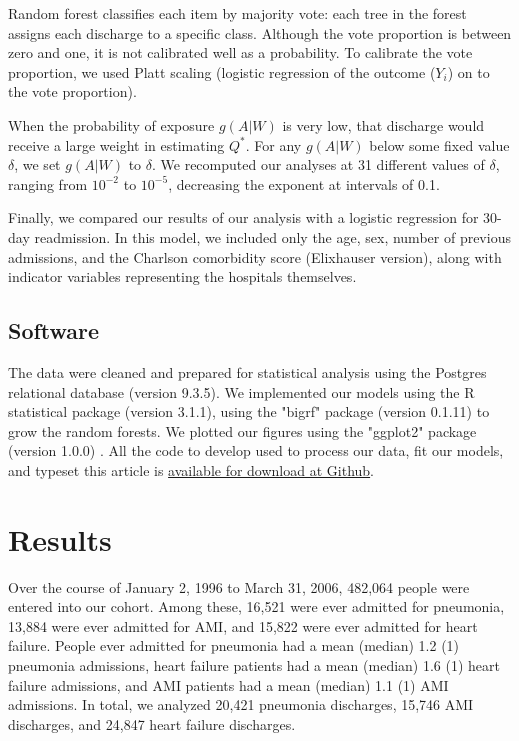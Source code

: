 \documentclass[]{article}\usepackage[]{graphicx}\usepackage[]{color}
\begin{document}
Random forest classifies each item by majority vote: each tree in the forest assigns each discharge to a specific class. Although the vote proportion is between zero and one, it is not calibrated well as a probability. To calibrate the vote proportion, we used Platt scaling\supercite{platt_probabilistic_1999} (logistic regression of the outcome ($Y_i$) on to the vote proportion).

When the probability of exposure $g(A|W)$ is very low, that discharge would receive a large weight in estimating $Q^*$. For any $g(A|W)$ below some fixed value $\delta$, we set $g(A|W)$ to $\delta$. We recomputed our analyses at 31 different values of $\delta$, ranging from $10^{-2}$ to $10^{-5}$, decreasing the exponent at intervals of 0.1.

Finally, we compared our results of our analysis with a logistic regression for 30-day readmission. In this model, we included only the age, sex, number of previous admissions, and the Charlson comorbidity score (Elixhauser version)\supercite{elixhauser_comorbidity_1998}, along with indicator variables representing the hospitals themselves.

\subsection{Software}
The data were cleaned and prepared for statistical analysis using the Postgres relational database (version 9.3.5). We implemented our models using the R statistical package (version 3.1.1),\supercite{team_r:_2014} using the "bigrf" package (version 0.1.11) to grow the random forests.\supercite{lim_bigrf:_2014} We plotted our figures using the "ggplot2" package (version 1.0.0) .\supercite{wickham_ggplot2:_2009} All the code to develop used to process our data, fit our models, and typeset this article is \href{https://github.com/nograpes/tmle_readmissions}{available for download at Github}.

\section{Results}


Over the course of January 2, 1996 to March 31, 2006, 482,064 people were entered into our cohort. Among these, 16,521 were ever admitted for pneumonia, 13,884 were ever admitted for AMI, and 15,822 were ever admitted for heart failure. People ever admitted for pneumonia had a mean (median) 1.2 (1) pneumonia admissions, heart failure patients had a mean (median) 1.6 (1) heart failure admissions, and AMI patients had a mean (median) 1.1 (1) AMI admissions. In total, we analyzed 20,421 pneumonia discharges, 15,746 AMI discharges, and 24,847 heart failure discharges.
\end{document}

